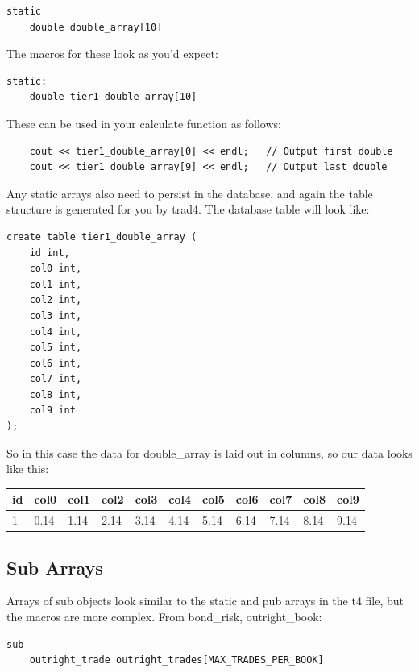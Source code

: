 \documentclass{report}
\begin{document}
\begin{verbatim}
static
    double double_array[10]
\end{verbatim}

The macros for these look as you'd expect:

\begin{verbatim}
static:
    double tier1_double_array[10]
\end{verbatim}

These can be used in your calculate function as follows:

\begin{verbatim}
    cout << tier1_double_array[0] << endl;   // Output first double
    cout << tier1_double_array[9] << endl;   // Output last double
\end{verbatim}

Any static arrays also need to persist in the database, and again the table structure is generated for you 
by trad4. The database table will look like:

\begin{verbatim}
create table tier1_double_array (
    id int,
    col0 int,
    col1 int,
    col2 int,
    col3 int,
    col4 int,
    col5 int,
    col6 int,
    col7 int,
    col8 int,
    col9 int
);
\end{verbatim}

So in this case the data for double_array is laid out in columns, so our data looks like this:


\begin {tabular} {| l | l | l | l | l | l | l | l | l | l | l |}
\hline
id & col0 & col1 & col2 & col3 & col4 & col5 & col6 & col7 & col8 & col9 \\
\hline
1 & 0.14 & 1.14 & 2.14 & 3.14 & 4.14 & 5.14 & 6.14 & 7.14 & 8.14 & 9.14 \\
\hline
\end {tabular}


\subsection{Sub Arrays}

Arrays of sub objects look similar to the static and pub arrays in the t4 file, but the macros are more complex. From bond_risk, outright_book:

\begin{verbatim}
sub
    outright_trade outright_trades[MAX_TRADES_PER_BOOK]
\end{verbatim}
\end{document}
